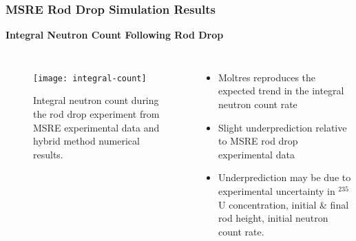 \begin{frame}
  \frametitle{MSRE Rod Drop Simulation Results}
  \textbf{Integral Neutron Count Following Rod Drop}
  \begin{columns}
    \column{5.5cm}
    \begin{figure}[t]
      \centering
      \texttt{[image: integral-count]}
      \caption{Integral neutron count during the rod drop experiment from \gls{MSRE} experimental data
      and hybrid method numerical results.}
      \label{fig:integral-count}
    \end{figure}
    \column{5.5cm}
    \begin{itemize}
      \item Moltres reproduces the expected trend in the integral neutron count rate
      \item Slight underprediction relative to MSRE rod drop experimental data
      \item Underprediction may be due to experimental uncertainty in $^{235}$U concentration,
        initial \& final rod height, initial neutron count rate.
    \end{itemize}
  \end{columns}
\end{frame}


